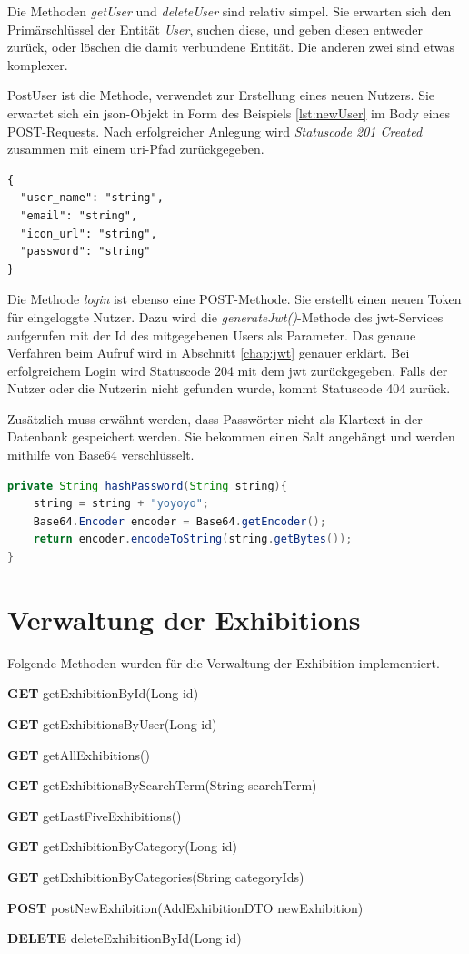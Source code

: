 Die Methoden \emph{getUser} und \emph{deleteUser} sind relativ simpel. 
Sie erwarten sich den Primärschlüssel der Entität \emph{User}, suchen diese, und geben diesen entweder zurück, oder löschen die damit verbundene Entität.
Die anderen zwei sind etwas komplexer. 

PostUser ist die Methode, verwendet zur Erstellung eines neuen Nutzers. 
Sie erwartet sich ein \gls{json}-Objekt in Form des Beispiels \ref{lst:newUser} im Body eines POST-Requests. 
Nach erfolgreicher Anlegung wird \emph{Statuscode 201 Created} zusammen mit einem \gls{uri}-Pfad zurückgegeben. 

\begin{lstlisting}[label=lst:newUser, caption=PostUser]
{
  "user_name": "string",
  "email": "string",
  "icon_url": "string",
  "password": "string"
}
\end{lstlisting}

Die Methode \emph{login} ist ebenso eine POST-Methode. 
Sie erstellt einen neuen Token für eingeloggte Nutzer. 
Dazu wird die \emph{generateJwt()}-Methode des \gls{jwt}-Services aufgerufen mit der Id des mitgegebenen Users als Parameter. 
Das genaue Verfahren beim Aufruf wird in Abschnitt \ref{chap:jwt} genauer erklärt. 
Bei erfolgreichem Login wird Statuscode 204 mit dem \gls{jwt} zurückgegeben. 
Falls der Nutzer oder die Nutzerin nicht gefunden wurde, kommt Statuscode 404 zurück.

Zusätzlich muss erwähnt werden, dass Passwörter nicht als Klartext in der Datenbank gespeichert werden. 
Sie bekommen einen Salt angehängt und werden mithilfe von Base64 verschlüsselt.
\begin{lstlisting}[label=lst:passwordhashing,language=Java, caption=Hashing des Passwortes]
private String hashPassword(String string){
    string = string + "yoyoyo";
    Base64.Encoder encoder = Base64.getEncoder();
    return encoder.encodeToString(string.getBytes());
}
\end{lstlisting}

\section{Verwaltung der Exhibitions}
Folgende Methoden wurden für die Verwaltung der Exhibition implementiert. 
\begin{compactitem}
    \item \textbf{GET} getExhibitionById(Long id)
    \item \textbf{GET} getExhibitionsByUser(Long id) 
    \item \textbf{GET} getAllExhibitions()
    \item \textbf{GET} getExhibitionsBySearchTerm(String searchTerm)
    \item \textbf{GET} getLastFiveExhibitions() 
    \item \textbf{GET} getExhibitionByCategory(Long id) 
    \item \textbf{GET} getExhibitionByCategories(String categoryIds)
    \item \textbf{POST} postNewExhibition(AddExhibitionDTO newExhibition)
    \item \textbf{DELETE} deleteExhibitionById(Long id)
\end{compactitem}

